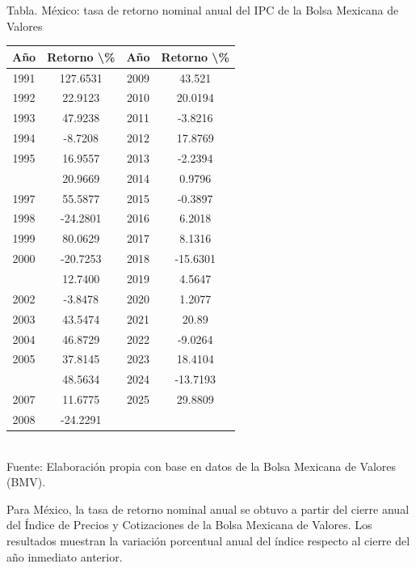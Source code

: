 \documentclass{article}\usepackage[]{graphicx}\usepackage[]{xcolor}
\begin{document}
\begin{center}
Tabla. México: tasa de retorno nominal anual del IPC de la Bolsa Mexicana de Valores
\end{center}
\begin{center}

\begin{tabular}{cccc}
\toprule
Año & Retorno \textbackslash{}\% & Año & Retorno \textbackslash{}\%\\
\midrule
1991 & 127.6531 & 2009 & 43.521\\
1992 & 22.9123 & 2010 & 20.0194\\
1993 & 47.9238 & 2011 & -3.8216\\
1994 & -8.7208 & 2012 & 17.8769\\
1995 & 16.9557 & 2013 & -2.2394\\
\addlinespace
1996 & 20.9669 & 2014 & 0.9796\\
1997 & 55.5877 & 2015 & -0.3897\\
1998 & -24.2801 & 2016 & 6.2018\\
1999 & 80.0629 & 2017 & 8.1316\\
2000 & -20.7253 & 2018 & -15.6301\\
\addlinespace
2001 & 12.7400 & 2019 & 4.5647\\
2002 & -3.8478 & 2020 & 1.2077\\
2003 & 43.5474 & 2021 & 20.89\\
2004 & 46.8729 & 2022 & -9.0264\\
2005 & 37.8145 & 2023 & 18.4104\\
\addlinespace
2006 & 48.5634 & 2024 & -13.7193\\
2007 & 11.6775 & 2025 & 29.8809\\
2008 & -24.2291 &  & \\
\bottomrule
\end{tabular}
\\[0.3em]
{\footnotesize Fuente: Elaboración propia con base en datos de la Bolsa Mexicana de Valores (BMV).}
\end{center}


Para México, la tasa de retorno nominal anual se obtuvo a partir del cierre anual del Índice de Precios y Cotizaciones de la Bolsa Mexicana de Valores. Los resultados muestran la variación porcentual anual del índice respecto al cierre del año inmediato anterior.
\end{document}
